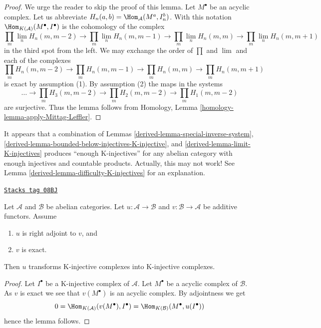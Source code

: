 \begin{proof}
We urge the reader to skip the proof of this lemma.
Let $M^\bullet$ be an acyclic complex. Let us abbreviate
$H_n(a, b) = \Hom_\mathcal{A}(M^a, I_n^b)$. With this notation
$\Hom_{K(\mathcal{A})}(M^\bullet, I^\bullet)$ is the cohomology
of the complex
$$
\prod_m \lim\limits_n H_n(m, m - 2)
\to
\prod_m \lim\limits_n H_n(m, m - 1)
\to
\prod_m \lim\limits_n H_n(m, m)
\to
\prod_m \lim\limits_n H_n(m, m + 1)
$$
in the third spot from the left.
We may exchange the order of $\prod$ and $\lim$ and each of the complexes
$$
\prod_m H_n(m, m - 2)
\to
\prod_m H_n(m, m - 1)
\to
\prod_m H_n(m, m)
\to
\prod_m H_n(m, m + 1)
$$
is exact by assumption (1). By assumption (2) the maps in the systems
$$
\ldots \to
\prod_m H_3(m, m - 2) \to
\prod_m H_2(m, m - 2) \to
\prod_m H_1(m, m - 2)
$$
are surjective. Thus the lemma follows from
Homology, Lemma \ref{homology-lemma-apply-Mittag-Leffler}.
\end{proof}

It appears that a combination of Lemmas \ref{derived-lemma-special-inverse-system},
\ref{derived-lemma-bounded-below-injectives-K-injective}, and
\ref{derived-lemma-limit-K-injectives} produces ``enough K-injectives'' for any
abelian category with enough injectives and countable products.
Actually, this may not work! See Lemma \ref{derived-lemma-difficulty-K-injectives}
for an explanation.

\begin{lemma}
\label{derived-lemma-adjoint-preserve-K-injectives}
\href{https://stacks.math.columbia.edu/tag/08BJ}{\texttt{Stacks tag 08BJ}}

Let $\mathcal{A}$ and $\mathcal{B}$ be abelian categories.
Let $u : \mathcal{A} \to \mathcal{B}$ and
$v : \mathcal{B} \to \mathcal{A}$ be additive functors. Assume
\begin{enumerate}
\item $u$ is right adjoint to $v$, and
\item $v$ is exact.
\end{enumerate}
Then $u$ transforms K-injective complexes into K-injective complexes.
\end{lemma}

\begin{proof}
Let $I^\bullet$ be a K-injective complex of $\mathcal{A}$.
Let $M^\bullet$ be a acyclic complex of $\mathcal{B}$.
As $v$ is exact we see that $v(M^\bullet)$ is an acyclic complex.
By adjointness we get
$$
0 = \Hom_{K(\mathcal{A})}(v(M^\bullet), I^\bullet) =
\Hom_{K(\mathcal{B})}(M^\bullet, u(I^\bullet))
$$
hence the lemma follows.
\end{proof}

